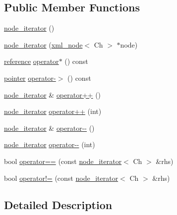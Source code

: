 \subsection*{Public Member Functions}
\begin{DoxyCompactItemize}
\item 
\hyperlink{classrapidxml_1_1node__iterator_a4e1244b9e9e1d2b5129235806d1e31ad}{node\+\_\+iterator} ()
\item 
\hyperlink{classrapidxml_1_1node__iterator_a94c3da59b54e4bd003e226cc35b3c266}{node\+\_\+iterator} (\hyperlink{classrapidxml_1_1xml__node}{xml\+\_\+node}$<$ Ch $>$ $\ast$node)
\item 
\hyperlink{classrapidxml_1_1node__iterator_ad7fabbcb7d3d9e4e220299c5475b9e9c}{reference} \hyperlink{classrapidxml_1_1node__iterator_ab31fe5bc1fd01fee8a2b31c3e42d78ed}{operator$\ast$} () const 
\item 
\hyperlink{classrapidxml_1_1node__iterator_a65dca8bca2b9c29f635b9ad0bdeeecb9}{pointer} \hyperlink{classrapidxml_1_1node__iterator_a9b3e7d58c4a628524914932e0663ddfb}{operator-\/$>$} () const 
\item 
\hyperlink{classrapidxml_1_1node__iterator}{node\+\_\+iterator} \& \hyperlink{classrapidxml_1_1node__iterator_a8d6b184a76b2ec8a8b5e90bc013c80ed}{operator++} ()
\item 
\hyperlink{classrapidxml_1_1node__iterator}{node\+\_\+iterator} \hyperlink{classrapidxml_1_1node__iterator_ad01b4e43e348a330984833fd4924d0f2}{operator++} (int)
\item 
\hyperlink{classrapidxml_1_1node__iterator}{node\+\_\+iterator} \& \hyperlink{classrapidxml_1_1node__iterator_ace52107ecd1bcf02e49619e86206e3a3}{operator-\/-\/} ()
\item 
\hyperlink{classrapidxml_1_1node__iterator}{node\+\_\+iterator} \hyperlink{classrapidxml_1_1node__iterator_a4ca35716bb7865f199a137b063af6080}{operator-\/-\/} (int)
\item 
bool \hyperlink{classrapidxml_1_1node__iterator_a5cb8a3b0d65a1a2517995e986a4debfd}{operator==} (const \hyperlink{classrapidxml_1_1node__iterator}{node\+\_\+iterator}$<$ Ch $>$ \&rhs)
\item 
bool \hyperlink{classrapidxml_1_1node__iterator_a20f1e25347d7e3856694f18597f7c8e2}{operator!=} (const \hyperlink{classrapidxml_1_1node__iterator}{node\+\_\+iterator}$<$ Ch $>$ \&rhs)
\end{DoxyCompactItemize}


\subsection{Detailed Description}
